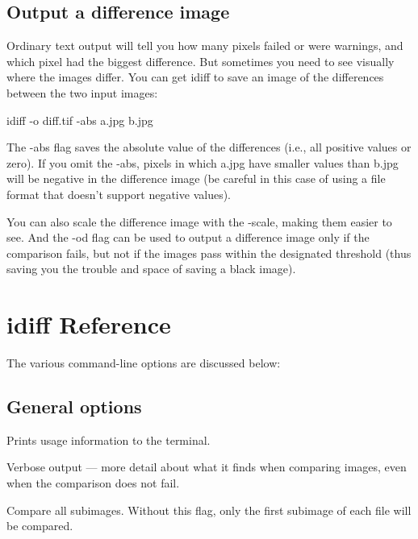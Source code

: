 

\subsection*{Output a difference image}

Ordinary text output will tell you how many pixels failed or were
warnings, and which pixel had the biggest difference.  But sometimes
you need to see visually where the images differ.  You can get
{\cf idiff} to save an image of the differences between the two input
images:

\begin{code}
    idiff -o diff.tif -abs a.jpg b.jpg
\end{code}

The {\cf -abs} flag saves the absolute value of the differences
(i.e., all positive values or zero).  If you omit the {\cf -abs},
pixels in which {\cf a.jpg} have smaller values than {\cf b.jpg}
will be negative in the difference image (be careful in this case
of using a file format that doesn't support negative values).

You can also scale the difference image with the {\cf -scale},
making them easier to see.  And the {\cf -od} flag can be used
to output a difference image only if the comparison fails, but 
not if the images pass within the designated threshold (thus
saving you the trouble and space of saving a black image).


\section{{\cf idiff} Reference}

The various command-line options are discussed below:

\subsection*{General options}

Prints usage information to the terminal.
\apiend

Verbose output --- more detail about what it finds when comparing
images, even when the comparison does not fail.
\apiend

Compare all subimages.  Without this flag, only the first subimage
of each file will be compared.
\apiend


